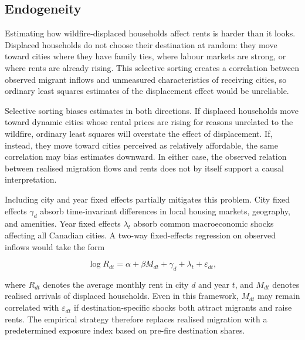 \documentclass[12pt]{article}
\begin{document}
\subsection{Endogeneity}

Estimating how wildfire-displaced households affect rents is harder than it
looks. Displaced households do not choose their destination at random: they move
toward cities where they have family ties, where labour markets are strong, or
where rents are already rising. This selective sorting creates a correlation
between observed migrant inflows and unmeasured characteristics of receiving
cities, so ordinary least squares estimates of the displacement effect would be
unreliable.

Selective sorting biases estimates in both directions. If displaced households move toward
dynamic cities whose rental prices are rising for reasons unrelated to the
wildfire, ordinary least squares will overstate the effect of displacement. If,
instead, they move toward cities perceived as relatively affordable, the same
correlation may bias estimates downward. In either case, the observed relation
between realised migration flows and rents does not by itself support a causal
interpretation.

Including city and year fixed effects partially mitigates this problem. City
fixed effects $\gamma_d$ absorb time-invariant differences in local housing
markets, geography, and amenities. Year fixed effects $\lambda_t$ absorb common
macroeconomic shocks affecting all Canadian cities. A two-way fixed-effects regression on observed inflows would take the form

\begin{equation*}
\log R_{dt} = \alpha + \beta M_{dt} + \gamma_d + \lambda_t + \varepsilon_{dt},
\end{equation*}

where $R_{dt}$ denotes the average monthly rent in city $d$ and year $t$, and
$M_{dt}$ denotes realised arrivals of displaced households. Even in this
framework, $M_{dt}$ may remain correlated with $\varepsilon_{dt}$ if
destination-specific shocks both attract migrants and raise rents. The empirical
strategy therefore replaces realised migration with a predetermined exposure
index based on pre-fire destination shares.

\end{document}
